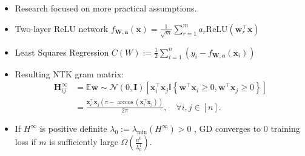 \documentclass[serif, aspectratio=169]{beamer}
\newcommand{\relu}{\text{ReLU}}
\newcommand{\E}{\mathbb{E}}
\begin{document}
\begin{frame}
	\begin{itemize}
		\item Research focused on more practical assumptions.
		\item Two-layer ReLU network \(f_{\mathbf{W},\mathbf{a}}(\mathbf{x}) = \frac{1}{\sqrt{m}}\sum_{r=1}^{m} a_r \relu(\mathbf{w}_r^\top \mathbf{x})
		\)
		\item Least Squares Regression \(C(W):=\frac{1}{2}\sum_{i=1}^{n}(y_i - f_{\mathbf{W},\mathbf{a}}(\mathbf{x}_i))\)
		\item Resulting NTK gram matrix:
		\begin{align}
		\mathbf{H}_{ij}^\infty &= \E{\mathbf{w} \sim \mathcal{N}(0,\mathbf{I})}\left[ \mathbf{x}_i^\top \mathbf{x}_j\mathbb{I}\left\{\mathbf{w}^\top \mathbf{x}_i \ge 0, \mathbf{w}^\top \mathbf{x}_j \ge 0\right\}\right] \\
		&= \frac{\mathbf{x}_i^\top\mathbf{x}_j\left(\pi - \arccos(\mathbf{x}_i^\top\mathbf{x}_j)\right)}{2\pi}, \quad \forall i, j\in[n].
		\end{align}
		\item  If \(H^\infty\) is positive
		definite \(\lambda_0 := \lambda_{\min}(H^{\infty})>0\) , GD converges to \(0\) training loss if \(m\) is sufficiently large \(\Omega(\frac{n^6}{\lambda_0^4})\).
	\end{itemize}
\end{frame}



\end{document}
